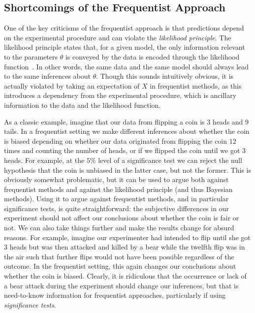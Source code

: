 \subsection{Shortcomings of the Frequentist Approach}
\label{sec:bayes:religion:freq}

One of the key criticisms of the frequentist approach is that predictions depend on the experimental procedure and
can violate the \emph{likelihood principle}.  The likelihood principle states that, for a given model, 
the only information relevant
to the parameters $\theta$ is conveyed by the data is encoded through the likelihood function~\citep{robert2007bayesian}.  
In other words, the same data and 
the same model should always lead to the same inferences about $\theta$.  Though this sounds intuitively obvious, it is actually violated by
taking an expectation of $X$ in frequentist methods, as this introduces a dependency from the experimental procedure, which
is ancillary information to the data and the likelihood function.  

As a classic example, 
imagine that our data from flipping a coin is $3$ heads and $9$ tails.
In a frequentist setting we make different inferences about whether the coin is biased 
depending on whether our data originated from flipping the coin $12$ times and counting the number of heads, or if we 
flipped the coin until we got $3$ heads.  For example, at the $5\%$ level of a significance test we can reject the null
hypothesis that the coin is unbiased in the latter case, but not the former.  This is obviously somewhat problematic, but it
can be used to argue both against frequentist methods and against the likelihood principle (and thus Bayesian methods).  Using it
to argue against frequentist methods, and in particular significance tests, is quite straightforward: the subjective
differences in our experiment should not affect our conclusions about whether the coin is fair or not.  We can also take things
further and make the results change for absurd reasons.  For example, imagine our experimenter had intended to flip until she got
$3$ heads but was then attacked and killed by a bear while the twelfth flip was in the air such that further flips would not
have been possible regardless of the outcome.  In the frequentist setting, this again changes our conclusions
about whether the coin is biased.  Clearly, it is ridiculous that the occurrence or lack of a bear attack during the experiment
should change our inferences, but that is need-to-know information for frequentist approaches, particularly if using \emph{significance tests}.

